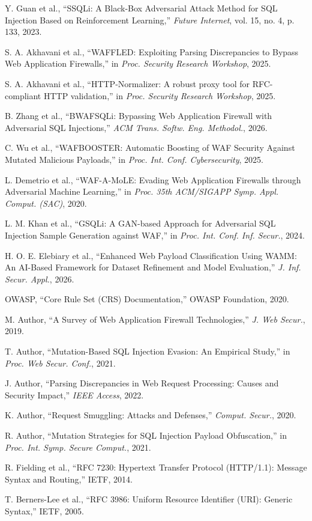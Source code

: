 Y. Guan et al., ``SSQLi: A Black-Box Adversarial Attack Method for SQL Injection Based on Reinforcement Learning,'' \emph{Future Internet}, vol. 15, no. 4, p. 133, 2023.

S. A. Akhavani et al., ``WAFFLED: Exploiting Parsing Discrepancies to Bypass Web Application Firewalls,'' in \emph{Proc. Security Research Workshop}, 2025.

S. A. Akhavani et al., ``HTTP-Normalizer: A robust proxy tool for RFC-compliant HTTP validation,'' in \emph{Proc. Security Research Workshop}, 2025.

B. Zhang et al., ``BWAFSQLi: Bypassing Web Application Firewall with Adversarial SQL Injections,'' \emph{ACM Trans. Softw. Eng. Methodol.}, 2026.

C. Wu et al., ``WAFBOOSTER: Automatic Boosting of WAF Security Against Mutated Malicious Payloads,'' in \emph{Proc. Int. Conf. Cybersecurity}, 2025.

L. Demetrio et al., ``WAF-A-MoLE: Evading Web Application Firewalls through Adversarial Machine Learning,'' in \emph{Proc. 35th ACM/SIGAPP Symp. Appl. Comput. (SAC)}, 2020.

L. M. Khan et al., ``GSQLi: A GAN-based Approach for Adversarial SQL Injection Sample Generation against WAF,'' in \emph{Proc. Int. Conf. Inf. Secur.}, 2024.

H. O. E. Elebiary et al., ``Enhanced Web Payload Classification Using WAMM: An AI-Based Framework for Dataset Refinement and Model Evaluation,'' \emph{J. Inf. Secur. Appl.}, 2026.

OWASP, ``Core Rule Set (CRS) Documentation,'' OWASP Foundation, 2020.

M. Author, ``A Survey of Web Application Firewall Technologies,'' \emph{J. Web Secur.}, 2019.

T. Author, ``Mutation-Based SQL Injection Evasion: An Empirical Study,'' in \emph{Proc. Web Secur. Conf.}, 2021.

J. Author, ``Parsing Discrepancies in Web Request Processing: Causes and Security Impact,'' \emph{IEEE Access}, 2022.

K. Author, ``Request Smuggling: Attacks and Defenses,'' \emph{Comput. Secur.}, 2020.

R. Author, ``Mutation Strategies for SQL Injection Payload Obfuscation,'' in \emph{Proc. Int. Symp. Secure Comput.}, 2021.

R. Fielding et al., ``RFC 7230: Hypertext Transfer Protocol (HTTP/1.1): Message Syntax and Routing,'' IETF, 2014.

T. Berners-Lee et al., ``RFC 3986: Uniform Resource Identifier (URI): Generic Syntax,'' IETF, 2005.

